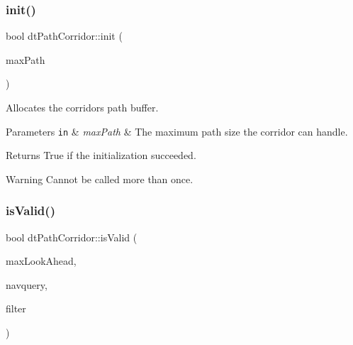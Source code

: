 \subsubsection{\texorpdfstring{init()}{init()}\hspace{0.1cm}{\footnotesize\ttfamily [2/2]}}
{\footnotesize\ttfamily bool dt\+Path\+Corridor\+::init (\begin{DoxyParamCaption}\item[{const int}]{max\+Path }\end{DoxyParamCaption})}

Allocates the corridor\textquotesingle{}s path buffer. 
\begin{DoxyParams}[1]{Parameters}
\mbox{\tt in}  & {\em max\+Path} & The maximum path size the corridor can handle. \\
\hline
\end{DoxyParams}
\begin{DoxyReturn}{Returns}
True if the initialization succeeded.
\end{DoxyReturn}
\begin{DoxyParagraph}{}

\end{DoxyParagraph}
\begin{DoxyWarning}{Warning}
Cannot be called more than once. 
\end{DoxyWarning}
\mbox{\label{classdtPathCorridor_aeb23d3697b0e17837b06b13ae5be4e52}} 
\subsubsection{\texorpdfstring{is\+Valid()}{isValid()}\hspace{0.1cm}{\footnotesize\ttfamily [1/2]}}
{\footnotesize\ttfamily bool dt\+Path\+Corridor\+::is\+Valid (\begin{DoxyParamCaption}\item[{const int}]{max\+Look\+Ahead,  }\item[{\hyperlink{classdtNavMeshQuery}{dt\+Nav\+Mesh\+Query} $\ast$}]{navquery,  }\item[{const \hyperlink{classdtQueryFilter}{dt\+Query\+Filter} $\ast$}]{filter }\end{DoxyParamCaption})}

